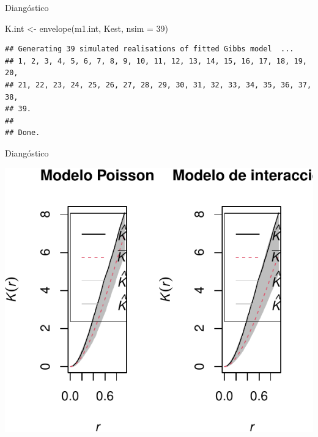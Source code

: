 \documentclass[
  11pt,
  ignorenonframetext,
]{beamer}
\newenvironment{Shaded}{}{}
\newcommand{\AttributeTok}[1]{\textcolor[rgb]{0.49,0.56,0.16}{#1}}
\newcommand{\DecValTok}[1]{\textcolor[rgb]{0.25,0.63,0.44}{#1}}
\newcommand{\FunctionTok}[1]{\textcolor[rgb]{0.02,0.16,0.49}{#1}}
\newcommand{\NormalTok}[1]{#1}
\newcommand{\OtherTok}[1]{\textcolor[rgb]{0.00,0.44,0.13}{#1}}
\begin{document}
\begin{frame}[fragile]{Diangóstico}
\protect\hypertarget{dianguxf3stico}{}
\begin{Shaded}
\begin{Highlighting}[]
\NormalTok{K.int }\OtherTok{\textless{}{-}} \FunctionTok{envelope}\NormalTok{(m1.int, Kest, }\AttributeTok{nsim =} \DecValTok{39}\NormalTok{)}
\end{Highlighting}
\end{Shaded}

\begin{verbatim}
## Generating 39 simulated realisations of fitted Gibbs model  ...
## 1, 2, 3, 4, 5, 6, 7, 8, 9, 10, 11, 12, 13, 14, 15, 16, 17, 18, 19, 20,
## 21, 22, 23, 24, 25, 26, 27, 28, 29, 30, 31, 32, 33, 34, 35, 36, 37, 38, 
## 39.
## 
## Done.
\end{verbatim}
\end{frame}

\begin{frame}{Diangóstico}
\protect\hypertarget{dianguxf3stico-1}{}
\begin{center}\includegraphics{Tutorial-spatstat-2_files/figure-beamer/unnamed-chunk-36-1} \end{center}
\end{frame}
\end{document}
